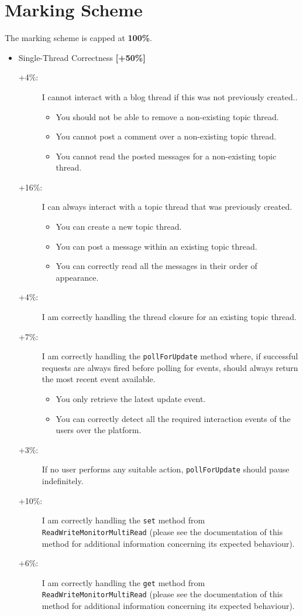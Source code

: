 \documentclass{article}
\begin{document}
	\section*{Marking Scheme} 
\renewcommand{\labelitemii}{$\blacksquare$}
	The marking scheme is capped at  \textbf{100\%}.
	\begin{itemize}
		\item Single-Thread Correctness \textbf{[+50\%]}
			\begin{description}
			\item [+4\%:] I cannot interact with a blog thread if this was not previously created..
\begin{itemize}
\item You should not be able to remove a non-existing topic thread.
\item You cannot post a comment over a non-existing topic thread.
\item You cannot read the posted messages for a non-existing topic thread.
\end{itemize}
			\item [+16\%:] I can always interact with a topic thread that was previously created.
\begin{itemize}
\item You can create a new topic thread.
\item You can post a message within an existing  topic thread.
\item You can correctly read all the messages in their order of appearance.
\end{itemize}

\item [+4\%:] I am correctly handling the thread closure for an existing topic thread.

\item [+7\%:] I am correctly handling the \texttt{pollForUpdate} method where, if successful requests are always fired before polling for events, should always return the most recent event available.
\begin{itemize}
\item You only retrieve the latest update event.
\item You can correctly detect all the required interaction events of the users over the platform.
\end{itemize}
\item [+3\%:] If no user performs any suitable action, \texttt{pollForUpdate} should pause indefinitely.

\item[+10\%: ] I am correctly handling the \texttt{set} method from \texttt{ReadWriteMonitorMultiRead} (please see the documentation of this method for additional information concerning its expected behaviour).
\item[+6\%: ] I am correctly handling the \texttt{get} method from \texttt{ReadWriteMonitorMultiRead} (please see the documentation of this method for additional information concerning its expected behaviour).





\end{description}
\end{itemize}
\end{document}
